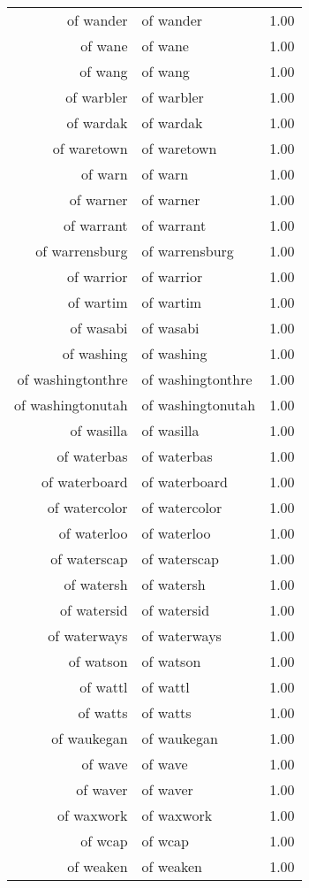 \begin{table}[ht]
\begin{tabular}{rlr}
  of wander & of wander & 1.00 \\ 
  of wane & of wane & 1.00 \\ 
  of wang & of wang & 1.00 \\ 
  of warbler & of warbler & 1.00 \\ 
  of wardak & of wardak & 1.00 \\ 
  of waretown & of waretown & 1.00 \\ 
  of warn & of warn & 1.00 \\ 
  of warner & of warner & 1.00 \\ 
  of warrant & of warrant & 1.00 \\ 
  of warrensburg & of warrensburg & 1.00 \\ 
  of warrior & of warrior & 1.00 \\ 
  of wartim & of wartim & 1.00 \\ 
  of wasabi & of wasabi & 1.00 \\ 
  of washing & of washing & 1.00 \\ 
  of washingtonthre & of washingtonthre & 1.00 \\ 
  of washingtonutah & of washingtonutah & 1.00 \\ 
  of wasilla & of wasilla & 1.00 \\ 
  of waterbas & of waterbas & 1.00 \\ 
  of waterboard & of waterboard & 1.00 \\ 
  of watercolor & of watercolor & 1.00 \\ 
  of waterloo & of waterloo & 1.00 \\ 
  of waterscap & of waterscap & 1.00 \\ 
  of watersh & of watersh & 1.00 \\ 
  of watersid & of watersid & 1.00 \\ 
  of waterways & of waterways & 1.00 \\ 
  of watson & of watson & 1.00 \\ 
  of wattl & of wattl & 1.00 \\ 
  of watts & of watts & 1.00 \\ 
  of waukegan & of waukegan & 1.00 \\ 
  of wave & of wave & 1.00 \\ 
  of waver & of waver & 1.00 \\ 
  of waxwork & of waxwork & 1.00 \\ 
  of wcap & of wcap & 1.00 \\ 
  of weaken & of weaken & 1.00 \\ 

\end{tabular}
\end{table}
